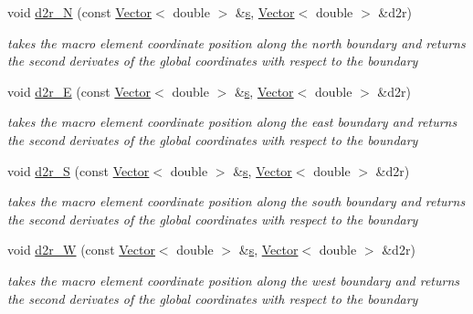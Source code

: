 \begin{DoxyCompactItemize}
void \hyperlink{classoomph_1_1TopologicallyRectangularDomain_a6cc86191b0085c8d7b3f05985cf647c8}{d2r\+\_\+N} (const \hyperlink{classoomph_1_1Vector}{Vector}$<$ double $>$ \&\hyperlink{cfortran_8h_ab7123126e4885ef647dd9c6e3807a21c}{s}, \hyperlink{classoomph_1_1Vector}{Vector}$<$ double $>$ \&d2r)
\begin{DoxyCompactList}\small\item\em takes the macro element coordinate position along the north boundary and returns the second derivates of the global coordinates with respect to the boundary \end{DoxyCompactList}\item 
void \hyperlink{classoomph_1_1TopologicallyRectangularDomain_ab40347c05811cfa8a76394204fd0611a}{d2r\+\_\+E} (const \hyperlink{classoomph_1_1Vector}{Vector}$<$ double $>$ \&\hyperlink{cfortran_8h_ab7123126e4885ef647dd9c6e3807a21c}{s}, \hyperlink{classoomph_1_1Vector}{Vector}$<$ double $>$ \&d2r)
\begin{DoxyCompactList}\small\item\em takes the macro element coordinate position along the east boundary and returns the second derivates of the global coordinates with respect to the boundary \end{DoxyCompactList}\item 
void \hyperlink{classoomph_1_1TopologicallyRectangularDomain_ae3bc22aeb952c657f3b3672068243197}{d2r\+\_\+S} (const \hyperlink{classoomph_1_1Vector}{Vector}$<$ double $>$ \&\hyperlink{cfortran_8h_ab7123126e4885ef647dd9c6e3807a21c}{s}, \hyperlink{classoomph_1_1Vector}{Vector}$<$ double $>$ \&d2r)
\begin{DoxyCompactList}\small\item\em takes the macro element coordinate position along the south boundary and returns the second derivates of the global coordinates with respect to the boundary \end{DoxyCompactList}\item 
void \hyperlink{classoomph_1_1TopologicallyRectangularDomain_a4522f1751b8105bb7da4e1a14a75c05a}{d2r\+\_\+W} (const \hyperlink{classoomph_1_1Vector}{Vector}$<$ double $>$ \&\hyperlink{cfortran_8h_ab7123126e4885ef647dd9c6e3807a21c}{s}, \hyperlink{classoomph_1_1Vector}{Vector}$<$ double $>$ \&d2r)
\begin{DoxyCompactList}\small\item\em takes the macro element coordinate position along the west boundary and returns the second derivates of the global coordinates with respect to the boundary \end{DoxyCompactList}\end{DoxyCompactItemize}
